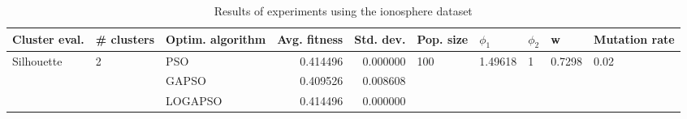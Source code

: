 \begin{table}
\centering
\caption{Results of experiments using the ionosphere dataset}
\begin{tabular}{lllrrlllll}
\toprule
              Cluster eval. &        \# clusters & Optim. algorithm &  Avg. fitness &  Std. dev. &            Pop. size &               $\phi_{1}$ &         $\phi_{2}$ &                       w &         Mutation rate \\
\midrule
\multirow{3}{*}{Silhouette} & \multirow{3}{*}{2} &              PSO &      0.414496 &   0.000000 & \multirow{3}{*}{100} & \multirow{3}{*}{1.49618} & \multirow{3}{*}{1} & \multirow{3}{*}{0.7298} & \multirow{3}{*}{0.02} \\
                            &                    &            GAPSO &      0.409526 &   0.008608 &                      &                          &                    &                         &                       \\
                            &                    &          LOGAPSO &      0.414496 &   0.000000 &                      &                          &                    &                         &                       \\
\bottomrule
\end{tabular}
\end{table}
